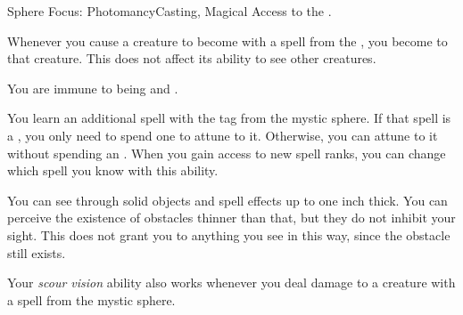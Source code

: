     \begin{feat}{Sphere Focus: Photomancy}{Casting, Magical}
        \featpre Access to the  .

         Whenever you cause a creature to become \dazzled with a spell from the  , you  become  to that creature.
        This does not affect its ability to see other creatures.

         You are immune to being \dazzled and \blinded.

         You learn an additional spell with the  tag from the  mystic sphere.
        If that spell is a , you only need to spend one  to attune to it.
        Otherwise, you can attune to it without spending an .
        When you gain access to new spell ranks, you can change which spell you know with this ability.

         You can see through solid objects and spell effects up to one inch thick.
        You can perceive the existence of obstacles thinner than that, but they do not inhibit your sight.
        This does not grant you  to anything you see in this way, since the obstacle still exists.

         Your \textit{scour vision} ability also works whenever you deal damage to a creature with a spell from the  mystic sphere.
    \end{feat}

